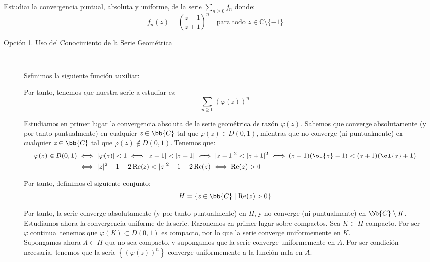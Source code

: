 \begin{ejercicio}
    Estudiar la convergencia puntual, absoluta y uniforme, de la serie $\displaystyle \sum_{n \geq 0} f_n$ donde:
    \[
        f_n(z) = \left(\dfrac{z-1}{z+1}\right)^n \quad \text{para todo } z \in \mathbb{C}\setminus\{-1\}
    \]

    \begin{description}
        \item[Opción 1. Uso del Conocimiento de la Serie Geométrica]~
        
        Sefinimos la siguiente función auxiliar:

        Por tanto, tenemos que nuestra serie a estudiar es:
        \begin{equation*}
            \sum_{n \geq 0} \left(\varphi(z)\right)^n
        \end{equation*}

        Estudiamos en primer lugar la convergencia absoluta de la serie geométrica de razón $\varphi(z)$. Sabemos que converge absolutamente (y por tanto puntualmente) en cualquier $z\in \bb{C}$ tal que $\varphi(z)\in D(0,1)$, mientras que no converge (ni puntualmente) en cualquier $z\in \bb{C}$ tal que $\varphi(z)\notin D(0,1)$. Tenemos que:
        \begin{align*}
            \varphi(z)\in D(0,1) &\iff |\varphi(z)|<1
            \iff |z-1|<|z+1|\iff |z-1|^2<|z+1|^2\iff (z-1)(\ol{z}-1)<(z+1)(\ol{z}+1)\\
            &\iff |z|^2+1 -2\Re(z)<|z|^2+1+2\Re(z)\iff \Re(z)>0
        \end{align*}

        Por tanto, definimos el siguiente conjunto:
        \begin{equation*}
            H = \{z\in \bb{C}\mid \Re(z)>0\}
        \end{equation*}

        Por tanto, la serie converge absolutamente (y por tanto puntualmente) en $H$, y no converge (ni puntualmente) en $\bb{C}\setminus H$.\\

        Estudiamos ahora la convergencia uniforme de la serie. Razonemos en primer lugar sobre compactos. Sea $K\subset H$ compacto. Por ser $\varphi$ continua, tenemos que $\varphi(K)\subset D(0,1)$ es compacto, por lo que la serie converge uniformemente en $K$.\\
        
        Supongamos ahora $A\subset H$ que no sea compacto, y supongamos que la serie converge uniformemente en $A$. Por ser condición necesaria, tenemos que la serie $\left\{(\varphi(z))^n\right\}$ converge uniformemente a la función nula en $A$. 
    \end{description}
\end{ejercicio}